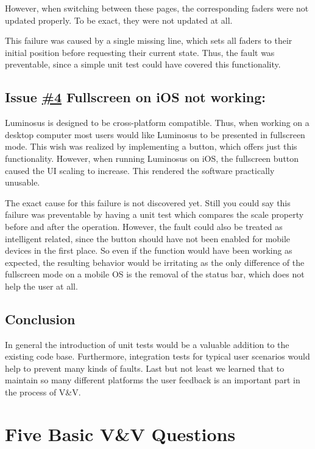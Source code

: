 \documentclass{scrreprt}
\begin{document}
However, when switching between these pages, the corresponding faders were not updated properly. To be exact, they were not updated at all.

This failure was caused by a single missing line, which sets all faders to their initial position before requesting their current state. Thus, the fault was preventable, since a simple unit test could have covered this functionality.


\subsection{Issue \href{https://github.com/ETCLabs/LuminosusEosEdition/issues/4}{\#4} Fullscreen on iOS not working:}

Luminosus is designed to be cross-platform compatible. Thus, when working on a desktop computer most users would like Luminosus to be presented in fullscreen mode. This wish was realized by implementing a button, which offers just this functionality.
However, when running Luminosus on iOS, the fullscreen button caused the UI scaling to increase. This rendered the software practically unusable.

The exact cause for this failure is not discovered yet. Still you could say this failure was preventable by having a unit test which compares the scale property before and after the operation. However, the fault could also be treated as intelligent related, since the button should have not been enabled for mobile devices in the first place. So even if the function would have been working as expected, the resulting behavior would be irritating as the only difference of the fullscreen mode on a mobile OS is the removal of the status bar, which does not help the user at all.

\subsection{Conclusion}
In general the introduction of unit tests would be a valuable addition to the existing code base. Furthermore, integration tests for typical user scenarios would help to prevent many kinds of faults. Last but not least we learned that to maintain so many different platforms the user feedback is an important part in the process of V\&V.


\section{Five Basic V\&V Questions}
\end{document}

